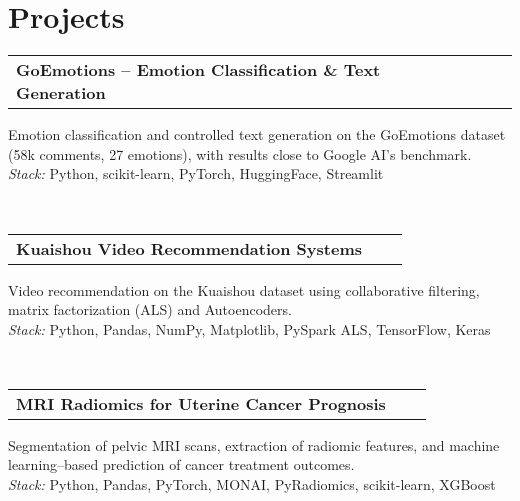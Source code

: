 \documentclass[a4paper,12pt]{article}
\begin{document}
\vspace{-0.7em}

\section{Projects}

\begin{tabularx}{\linewidth}{@{}l X r@{}}
\textbf{GoEmotions – Emotion Classification \& Text Generation} & \hfill & \\[3.75pt]
\end{tabularx}
\begin{minipage}[t]{\linewidth}
Emotion classification and controlled text generation on the GoEmotions dataset (58k comments, 27 emotions), with results close to Google AI’s benchmark. \\
\textit{Stack:} Python, scikit-learn, PyTorch, HuggingFace, Streamlit
\end{minipage} \\

\begin{tabularx}{\linewidth}{@{}l X r@{}}
\textbf{Kuaishou Video Recommendation Systems} & \hfill & \\[3.75pt]
\end{tabularx}
\begin{minipage}[t]{\linewidth}
Video recommendation on the Kuaishou dataset using collaborative filtering, matrix factorization (ALS) and Autoencoders. \\
\textit{Stack:} Python, Pandas, NumPy, Matplotlib, PySpark ALS, TensorFlow, Keras
\end{minipage} \\

\begin{tabularx}{\linewidth}{@{}l X r@{}}
\textbf{MRI Radiomics for Uterine Cancer Prognosis} & \hfill & \\[3.75pt]
\end{tabularx}
\begin{minipage}[t]{\linewidth}
Segmentation of pelvic MRI scans, extraction of radiomic features, and machine learning–based prediction of cancer treatment outcomes. \\
\textit{Stack:} Python, Pandas, PyTorch, MONAI, PyRadiomics, scikit-learn, XGBoost
\end{minipage}






\end{document}
